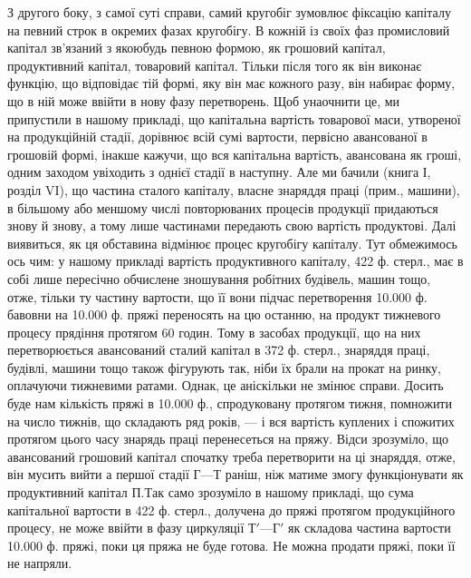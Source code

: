 З другого боку, з самої суті справи, самий кругобіг зумовлює фіксацію
капіталу на певний строк в окремих фазах кругобігу. В кожній із
своїх фаз промисловий капітал зв’язаний з якоюбудь певною формою,
як грошовий капітал, продуктивний капітал, товаровий капітал. Тільки
після того як він виконає функцію, що відповідає тій формі, яку він
має кожного разу, він набирає форму, що в ній може ввійти в нову
фазу перетворень. Щоб унаочнити це, ми припустили в нашому прикладі,
що капітальна вартість товарової маси, утвореної на продукційній стадії,
дорівнює всій сумі вартости, первісно авансованої в грошовій формі,
інакше кажучи, що вся капітальна вартість, авансована як гроші, одним
заходом увіходить з однієї стадії в наступну. Але ми бачили (книга І,
розділ VI), що частина сталого капіталу, власне знаряддя праці (прим.,
машини), в більшому або меншому числі повторюваних процесів продукції
придаються знову й знову, а тому лише частинами передають свою вартість
продуктові. Далі виявиться, як ця обставина відмінює процес кругобігу
капіталу. Тут обмежимось ось чим: у нашому прикладі вартість
продуктивного капіталу, 422 ф. стерл., має в собі лише пересічно обчислене
зношування робітних будівель, машин тощо, отже, тільки ту частину
вартости, що її вони підчас перетворення 10.000 ф. бавовни на 10.000 ф.
пряжі переносять на цю останню, на продукт тижневого процесу прядіння
протягом 60 годин. Тому в засобах продукції, що на них перетворюється
авансований сталий капітал в 372 ф. стерл., знаряддя праці, будівлі,
машини тощо також фігурують так, ніби їх брали на прокат на ринку,
оплачуючи тижневими ратами. Однак, це аніскільки не змінює справи.
Досить буде нам кількість пряжі в 10.000 ф., спродуковану протягом
тижня, помножити на число тижнів, що складають ряд років, — і вся
вартість куплених і спожитих протягом цього часу знарядь праці перенесеться
на пряжу. Відси зрозуміло, що авансований грошовий капітал
спочатку треба перетворити на ці знаряддя, отже, він мусить вийти а
першої стадії $Г — Т$ раніш, ніж матиме змогу функціонувати як продуктивний
капітал $П. Т$ак само зрозуміло в нашому прикладі, що сума
капітальної вартости в 422 ф. стерл., долучена до пряжі протягом продукційного
процесу, не може ввійти в фазу циркуляції $Т' — Г'$ як складова
частина вартости 10.000 ф. пряжі, поки ця пряжа не буде готова.
Не можна продати пряжі, поки її не напряли.


